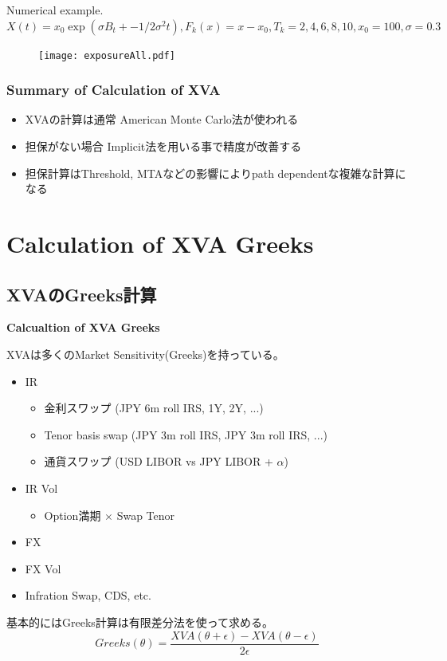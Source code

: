 \documentclass[driverfallback=dvipdfmx,cjk]{beamer}
\begin{document}
\begin{frame}
    Numerical example.
$X(t) = x_0 \exp(\sigma B_t + - 1/2 \sigma^2 t), F_k(x) = x - x_0, T_k = 2, 4, 6, 8, 10, x_0=100, \sigma = 0.3$
    \begin{figure}
        \texttt{[image: exposureAll.pdf]}
    \end{figure}
\end{frame}

\begin{frame}\frametitle{Summary of Calculation of XVA}
\begin{itemize}
    \item XVAの計算は通常 American Monte Carlo法が使われる
    \item 担保がない場合 Implicit法を用いる事で精度が改善する
    \item 担保計算はThreshold, MTAなどの影響によりpath dependentな複雑な計算になる
\end{itemize}    
\end{frame}

\section{Calculation of XVA Greeks}
\subsection{XVAのGreeks計算}
\begin{frame}
    \textbf{Calcualtion of XVA Greeks}
\end{frame}

\begin{frame}
    XVAは多くのMarket Sensitivity(Greeks)を持っている。
    \begin{itemize}
        \item IR
            \begin{itemize}
                \item 金利スワップ (JPY 6m roll IRS, 1Y, 2Y, ...)
                \item Tenor basis swap (JPY 3m roll IRS, JPY 3m roll IRS, ...)
                \item 通貨スワップ (USD LIBOR vs JPY LIBOR + $\alpha$)
            \end{itemize}
        \item IR Vol
            \begin{itemize}
                \item Option満期 $\times$ Swap Tenor
            \end{itemize}
        \item FX 
        \item FX Vol
        \item Infration Swap, CDS, etc.
    \end{itemize}
    基本的にはGreeks計算は有限差分法を使って求める。
    $$Greeks(\theta) = \frac{XVA(\theta+ \epsilon) - XVA(\theta - \epsilon)}{2 \epsilon} $$
\end{frame}
\end{document}
